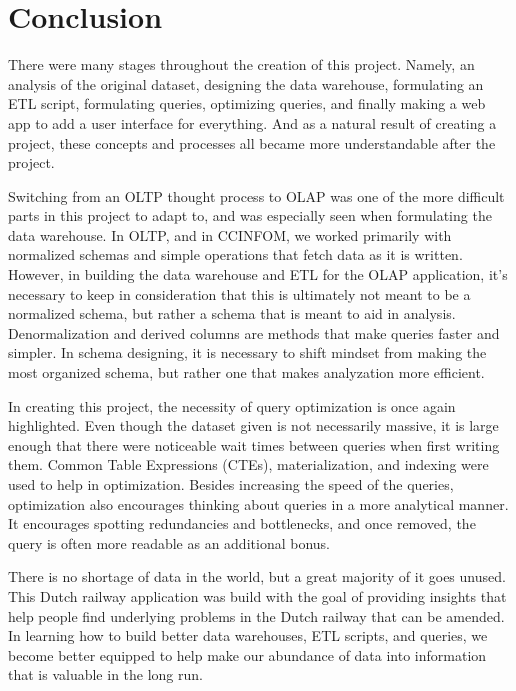 \section{Conclusion}
\label{sec:conclusion}

There were many stages throughout the creation of this project. Namely, an analysis of the original dataset, designing the data warehouse, formulating an ETL script, formulating queries, optimizing queries, and finally making a web app to add a user interface for everything. And as a natural result of creating a project, these concepts and processes all became more understandable after the project.

Switching from an OLTP thought process to OLAP was one of the more difficult parts in this project to adapt to, and was especially seen when formulating the data warehouse. In OLTP, and in CCINFOM, we worked primarily with normalized schemas and simple operations that fetch data as it is written. However, in building the data warehouse and ETL for the OLAP application, it's necessary to keep in consideration that this is ultimately not meant to be a normalized schema, but rather a schema that is meant to aid in analysis. Denormalization and derived columns are methods that make queries faster and simpler. In schema designing, it is necessary to shift mindset from making the most organized schema, but rather one that makes analyzation more efficient.

In creating this project, the necessity of query optimization is once again highlighted. Even though the dataset given is not necessarily massive, it is large enough that there were noticeable wait times between queries when first writing them. Common Table Expressions (CTEs), materialization, and indexing were used to help in optimization. Besides increasing the speed of the queries, optimization also encourages thinking about queries in a more analytical manner. It encourages spotting redundancies and bottlenecks, and once removed, the query is often more readable as an additional bonus.

There is no shortage of data in the world, but a great majority of it goes unused. This Dutch railway application was build with the goal of providing insights that help people find underlying problems in the Dutch railway that can be amended. In learning how to build better data warehouses, ETL scripts, and queries, we become better equipped to help make our abundance of data into information that is valuable in the long run.
